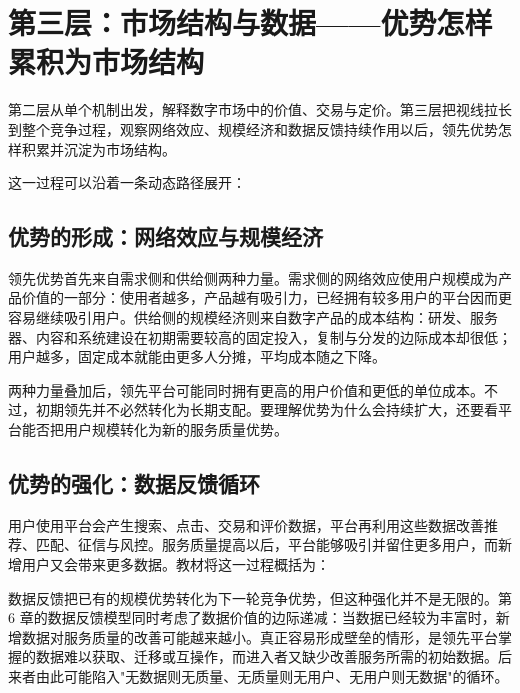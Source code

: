 \begin{center}
\end{center}

\section[第三层：市场结构与数据]{第三层：市场结构与数据——优势怎样累积为市场结构}

第二层从单个机制出发，解释数字市场中的价值、交易与定价。第三层把视线拉长到整个竞争过程，观察网络效应、规模经济和数据反馈持续作用以后，领先优势怎样积累并沉淀为市场结构。

这一过程可以沿着一条动态路径展开：

\begin{center}
\end{center}

\subsection{优势的形成：网络效应与规模经济}

领先优势首先来自需求侧和供给侧两种力量。需求侧的网络效应使用户规模成为产品价值的一部分：使用者越多，产品越有吸引力，已经拥有较多用户的平台因而更容易继续吸引用户。供给侧的规模经济则来自数字产品的成本结构：研发、服务器、内容和系统建设在初期需要较高的固定投入，复制与分发的边际成本却很低；用户越多，固定成本就能由更多人分摊，平均成本随之下降。

两种力量叠加后，领先平台可能同时拥有更高的用户价值和更低的单位成本。不过，初期领先并不必然转化为长期支配。要理解优势为什么会持续扩大，还要看平台能否把用户规模转化为新的服务质量优势。

\subsection{优势的强化：数据反馈循环}

用户使用平台会产生搜索、点击、交易和评价数据，平台再利用这些数据改善推荐、匹配、征信与风控。服务质量提高以后，平台能够吸引并留住更多用户，而新增用户又会带来更多数据。教材将这一过程概括为：

\begin{center}
\end{center}

数据反馈把已有的规模优势转化为下一轮竞争优势，但这种强化并不是无限的。第 6 章的数据反馈模型同时考虑了数据价值的边际递减：当数据已经较为丰富时，新增数据对服务质量的改善可能越来越小。真正容易形成壁垒的情形，是领先平台掌握的数据难以获取、迁移或互操作，而进入者又缺少改善服务所需的初始数据。后来者由此可能陷入"无数据则无质量、无质量则无用户、无用户则无数据"的循环。

